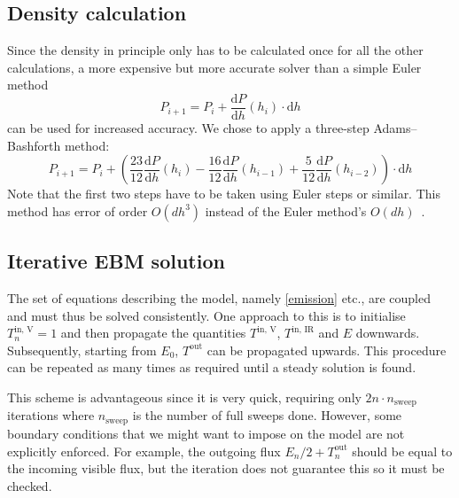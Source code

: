 \documentclass[a4paper,DIV=12,english]{scrartcl}
\begin{document}
\subsection{Density calculation}
Since the density in principle only has to be calculated once for all the other calculations, a more expensive but more accurate solver than a simple Euler method
\begin{equation}
    P_{i+1} = P_i + \frac{\text{d}P}{\text{d}h}(h_{i})\cdot \text{d}h
\end{equation}
can be used for increased accuracy. We chose to apply a three-step Adams–Bashforth method:
\begin{equation}
    P_{i+1} = P_i + \left(\frac{23}{12}\frac{\text{d}P}{\text{d}h}(h_{i}) - \frac{16}{12}\frac{\text{d}P}{\text{d}h}(h_{i-1}) + \frac{5}{12}\frac{\text{d}P}{\text{d}h}(h_{i-2}) \right)\cdot\text{d}h
\end{equation}
Note that the first two steps have to be taken using Euler steps or similar. This method has error of order $O(dh^3)$ instead of the Euler method's $O(dh)$~\cite{wiki_adams_bashforth}.

\subsection{Iterative EBM solution}
The set of equations describing the model, namely \eqref{emission} etc., are coupled and must thus be solved consistently. One approach to this is to initialise $T_{n}^{\text{in, V}} = 1$ and then propagate the quantities $T^{\text{in, V}}$, $T^{\text{in, IR}}$ and $E$ downwards. Subsequently, starting from $E_0$, $T^{\text{out}}$ can be propagated upwards. This procedure can be repeated as many times as required until a steady solution is found. 

This scheme is advantageous since it is very quick, requiring only $2n \cdot n_\text{sweep}$ iterations where $n_\text{sweep}$ is the number of full sweeps done. However, some boundary conditions that we might want to impose on the model are not explicitly enforced. For example, the outgoing flux $E_n/2 + T^{\text{out}}_n$ should be equal to the incoming visible flux, but the iteration does not guarantee this so it must be checked.
\end{document}
